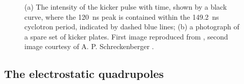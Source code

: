 \begin{figure}[t!]
\centering{}

\caption{(a) The intensity of the kicker pulse with time, shown by a black curve, where the \SI{120}{\nano\second} peak is contained within the \SI{149.2}{\nano\second} cyclotron period, indicated by dashed blue lines; (b) a photograph of a spare set of kicker plates. First image reproduced from \cite{BeamDynamics}, second image courtesy of A. P. Schreckenberger \cite{KickerPlates}.}
\label{fig:Kickers}
\end{figure} 


\subsection{The electrostatic quadrupoles}\label{sec:ESQs}


